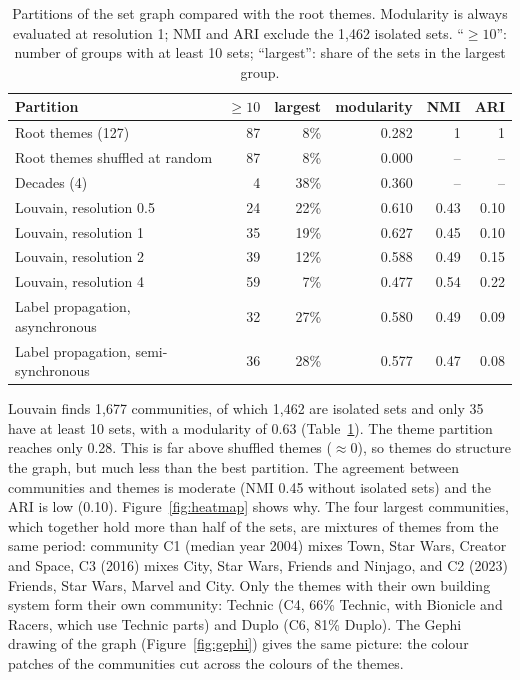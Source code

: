 \documentclass[10pt,a4paper]{article}
\begin{document}
\begin{table}[htbp]
  \centering
  \small
  \caption{Partitions of the set graph compared with the root themes.
  Modularity is always evaluated at resolution 1; NMI and ARI exclude the
  1,462 isolated sets. ``$\geq 10$'': number of groups with at least 10 sets;
  ``largest'': share of the sets in the largest group.}
  \label{tab:communities}
  \setlength{\tabcolsep}{4.5pt}
  \begin{tabular}{lrrrrr}
    \toprule
    Partition & $\geq 10$ & largest & modularity & NMI & ARI \\
    \midrule
    Root themes (127) & 87 & 8\% & 0.282 & 1 & 1 \\
    Root themes shuffled at random & 87 & 8\% & 0.000 & -- & -- \\
    Decades (4) & 4 & 38\% & 0.360 & -- & -- \\
    \midrule
    Louvain, resolution 0.5 & 24 & 22\% & 0.610 & 0.43 & 0.10 \\
    Louvain, resolution 1 & 35 & 19\% & 0.627 & 0.45 & 0.10 \\
    Louvain, resolution 2 & 39 & 12\% & 0.588 & 0.49 & 0.15 \\
    Louvain, resolution 4 & 59 & 7\% & 0.477 & 0.54 & 0.22 \\
    Label propagation, asynchronous & 32 & 27\% & 0.580 & 0.49 & 0.09 \\
    Label propagation, semi-synchronous & 36 & 28\% & 0.577 & 0.47 & 0.08 \\
    \bottomrule
  \end{tabular}
\end{table}

Louvain finds 1,677 communities, of which 1,462 are isolated sets and only 35
have at least 10 sets, with a modularity of 0.63 (Table~\ref{tab:communities}).
The theme partition reaches only 0.28. This is far above shuffled themes
($\approx 0$), so themes do structure the graph, but much less than the best
partition. The agreement between communities and themes is moderate
(NMI 0.45 without isolated sets) and the ARI is low (0.10).
Figure~\ref{fig:heatmap} shows why. The four largest communities, which
together hold more than half of the sets, are mixtures of themes from the same period:
community C1 (median year 2004) mixes Town, Star Wars, Creator and Space, C3
(2016) mixes City, Star Wars, Friends and Ninjago, and C2 (2023) Friends,
Star Wars, Marvel and City. Only the themes with their own building system
form their own community: Technic (C4, 66\% Technic, with Bionicle and Racers,
which use Technic parts) and Duplo (C6, 81\% Duplo). The Gephi drawing of the
graph (Figure~\ref{fig:gephi}) gives the same picture: the colour patches of
the communities cut across the colours of the themes.
\end{document}
